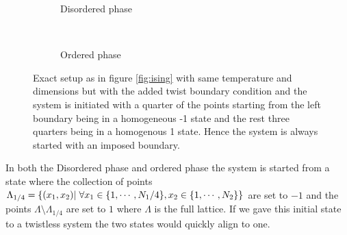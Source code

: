 \documentclass[english,twoside,openright]{UH_TCM_MSc}
\begin{document}
\begin{figure}[htpb]
    \centering
    \begin{subfigure}[t]{0.5\textwidth}
        \centering
        \caption{Disordered phase}
    \end{subfigure}%
    ~ 
    \begin{subfigure}[t]{0.5\textwidth}
        \centering
        \caption{Ordered phase}
    \end{subfigure}
    \caption{Exact setup as in figure \ref{fig:ising} with same temperature and dimensions but with the added twist boundary condition and the system is initiated with a quarter of the points starting from the left boundary being in a homogeneous -1 state and the rest three quarters being in a homogenous 1 state. Hence the system is always started with an imposed boundary.}
    \label{fig:ising_twist}
\end{figure}
In both the Disordered phase and ordered phase the system is started from a state where the collection of points $\Lambda_{1/4}= \{(x_1,x_2) |\hspace{3px}\forall x_1 \in \{1,\cdots,N_1/4\}, x_2\in \{1,\cdots,N_2\} \}$ are set to $-1$ and the points $\Lambda \setminus \Lambda_{1/4}$ are set to $1$ where $\Lambda$ is the full lattice. If we gave this initial state to a twistless system the two states would quickly align to one.
\end{document}
